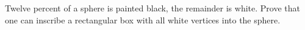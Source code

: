 Twelve percent of a sphere is painted black, the remainder is white. Prove that one can inscribe a rectangular box with all white vertices into the sphere.

